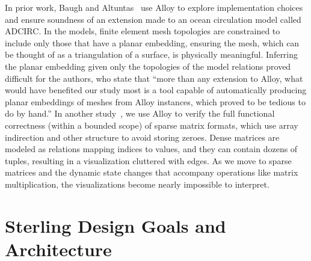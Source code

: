 \documentclass[runningheads]{llncs}
\begin{document}
In prior work, Baugh and Altuntas~\cite{baugh-scp-2018} use Alloy to explore implementation choices and ensure soundness of an extension made to an ocean circulation model called ADCIRC.
In the models, finite element mesh topologies are constrained to include only those that have a planar embedding, ensuring the mesh, which can be thought of as a triangulation of a surface, is physically meaningful. 
Inferring the planar embedding given only the topologies of the model relations proved difficult for the authors, who state that ``more than any extension to Alloy, what would have benefited our study most is a tool capable of automatically producing planar embeddings of meshes from Alloy instances, which proved to be tedious to do by hand.''
In another study~\cite{dyer2019}, we use Alloy to verify the full functional correctness (within a bounded scope) of sparse matrix formats, which use array indirection and other structure to avoid storing zeroes.
Dense matrices are modeled as relations mapping indices to values, and they can contain dozens of tuples, resulting in a visualization cluttered with edges.
As we move to sparse matrices and the dynamic state changes that accompany operations like matrix multiplication, the visualizations become nearly impossible to interpret.


\section{Sterling Design Goals and Architecture}
\label{sterling}

\end{document}
